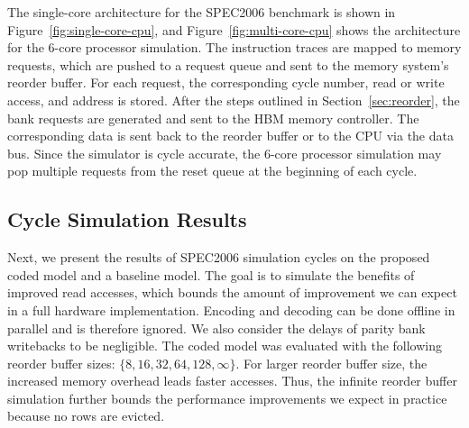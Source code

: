 The single-core architecture for the SPEC2006 benchmark is shown in Figure~\ref{fig:single-core-cpu}, and Figure~\ref{fig:multi-core-cpu} shows the architecture for the $6$-core processor simulation. The instruction traces are mapped to memory requests, which are pushed to a request queue and sent to the memory system's reorder buffer. For each request, the corresponding cycle number, read or write access, and address is stored. After the steps outlined in Section~\ref{sec:reorder}, the bank requests are generated and sent to the HBM memory controller. The corresponding data is sent back to the reorder buffer or to the CPU via the data bus. Since the simulator is cycle accurate, the $6$-core processor simulation may pop multiple requests from the reset queue at the beginning of each cycle.



\subsection{Cycle Simulation Results}
\label{sec:results}


Next, we present the results of SPEC2006 simulation cycles on the proposed coded model and a baseline model. The goal is to simulate the benefits of improved read accesses, which bounds the amount of improvement we can expect in a full hardware implementation. Encoding and decoding can be done offline in parallel and is therefore ignored. We also consider the delays of parity bank writebacks to be negligible. The coded model was evaluated with the following reorder buffer sizes: $\{8,16,32,64,128,\infty\}$.  
For larger reorder buffer size, the increased memory overhead leads faster accesses.
Thus, the infinite reorder buffer simulation further bounds the performance improvements we expect in practice because no rows are evicted. 


